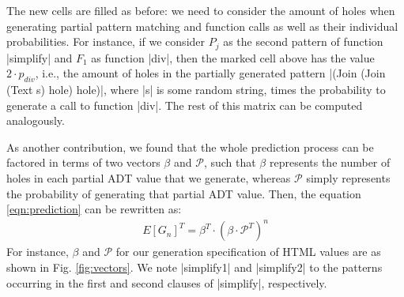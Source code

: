 The new cells are filled as before: we need to consider the amount of holes when
generating partial pattern matching and function calls as well as their
individual probabilities.
%
%
For instance, if we consider $P_j$ as the second pattern of function |simplify|
and $F_1$ as function |div|, then the marked cell above has the value
$2\cdot p_{div}$, i.e., the amount of holes in the partially generated pattern
|(Join (Join (Text s) hole) hole)|, where |s| is some random string, times the
probability to generate a call to function |div|.
%
The rest of this matrix can be computed analogously.

%

As another contribution, we found that the whole prediction process can be
factored in terms of two vectors $\beta$ and $\mathcal{P}$, such that $\beta$
represents the number of holes in each partial ADT value that we generate,
whereas $\mathcal{P}$ simply represents the probability of generating that
partial ADT value.%
%
Then, the equation \ref{eqn:prediction} can be rewritten as:
%
\begin{align*}
  E[G_n]^T = \beta^T \cdot (\beta \cdot \mathcal{P}^T)^{n}
\end{align*}
%
%
For instance, $\beta$ and $\mathcal{P}$ for our generation specification of HTML
values are as shown in Fig. \ref{fig:vectors}.
%
We note |simplify1| and |simplify2| to the patterns occurring in the first and
second clauses of |simplify|, respectively.


